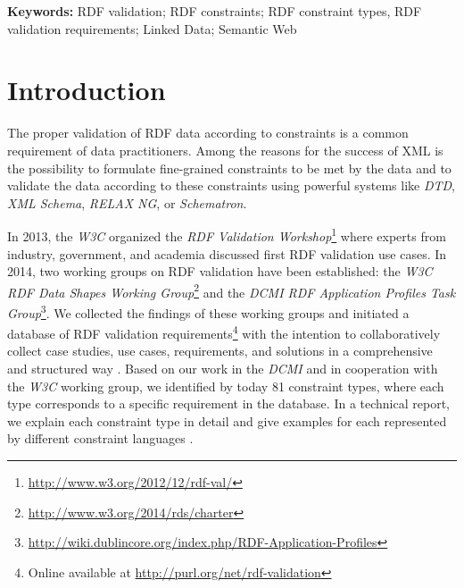 \documentclass[a4paper,fontsize=11pt]{scrartcl}
\begin{document}
\hspace{-1.4em}
\textbf{Keywords:}
RDF validation; RDF constraints; RDF constraint types, RDF validation requirements; Linked Data; Semantic Web

\section{Introduction}

The proper validation of RDF data according to constraints is a common requirement of data practitioners. 
Among the reasons for the success of XML is the possibility to formulate fine-grained constraints to be met by the data and to validate the data according to these constraints using powerful systems like \emph{DTD}, \emph{XML Schema}, \emph{RELAX NG}, or \emph{Schematron}.

In 2013, the \emph{W3C} organized the \emph{RDF Validation Workshop}\footnote{\url{http://www.w3.org/2012/12/rdf-val/}}
where experts from industry, government, and academia discussed first RDF validation use cases. 
In 2014, two working groups on RDF validation have been established: 
the \emph{W3C RDF Data Shapes Working Group}\footnote{\url{http://www.w3.org/2014/rds/charter}} and the \emph{DCMI RDF Application Profiles Task Group}\footnote{\url{http://wiki.dublincore.org/index.php/RDF-Application-Profiles}}. 
We collected the findings of these working groups and initiated a database of RDF validation requirements\footnote{Online available at \url{http://purl.org/net/rdf-validation}}
with the intention to collaboratively collect case studies, use cases, requirements, and solutions in a comprehensive and structured way \cite{BoschEckert2014}. 
Based on our work in the \emph{DCMI} and in cooperation with the \emph{W3C} working group,
we identified by today 81 constraint types, where each type corresponds to a specific requirement in the database. In a technical report, we explain each constraint type in detail and give examples for each represented by different constraint languages \cite{BoschNolleAcarEckert2015}.
\end{document}
